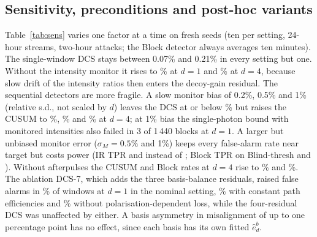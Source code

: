 \begin{table}[t]
\centering
\caption{Per-window false-alarm rate (\%) under benign operational events outside the drift model, applied to the second half of a 24-hour stream at $d=1$ (mean over ten fresh seeds), and the AUC of Blind-sub, which keeps its parameters just above the DCS+F floors.}\label{tab:stress}
\small
\end{table}

\subsection{Sensitivity, preconditions and post-hoc variants}\label{sec:sens}
Table~\ref{tab:sens} varies one factor at a time on fresh seeds (ten per setting, 24-hour streams, two-hour attacks; the Block detector always averages ten minutes). The single-window DCS stays between 0.07\% and 0.21\% in every setting but one. Without the intensity monitor it rises to \sensNoMonFprOne\% at $d=1$ and \sensNoMonFprFour\% at $d=4$, because slow drift of the intensity ratios then enters the decoy-gain residual. The sequential detectors are more fragile. A slow monitor bias of 0.2\%, 0.5\% and 1\% (relative s.d., not scaled by $d$) leaves the DCS at or below \sensBiasTenFprFour\% but raises the CUSUM to \sensBiasTwoCusumFprFour\%, \sensBiasFiveCusumFprFour\% and \sensBiasTenCusumFprFour\% at $d=4$; at 1\% bias the single-photon bound with monitored intensities also failed in 3 of 1\,440 blocks at $d=1$. A larger but unbiased monitor error ($\sigma_M=0.5\%$ and 1\%) keeps every false-alarm rate near target but costs power (IR TPR \sensMonHalfIrFive{} and \sensMonOneIrFive{} instead of \sensNomIrFive; Block TPR on Blind-thresh \sensMonHalfBlockThresh{} and \sensMonOneBlockThresh). Without afterpulses the CUSUM and Block rates at $d=4$ rise to \sensApZeroCusumFprFour\% and \sensApZeroBlockFprFour\%. The ablation DCS-7, which adds the three basis-balance residuals, raised false alarms in \sensNomSevenFprOne\% of windows at $d=1$ in the nominal setting, \sensPathZeroSevenFprOne\% with constant path efficiencies and \sensPdlZeroSevenFprOne\% without polarisation-dependent loss, while the four-residual DCS was unaffected by either. A basis asymmetry in misalignment of up to one percentage point has no effect, since each basis has its own fitted $\hat e_d^b$.

